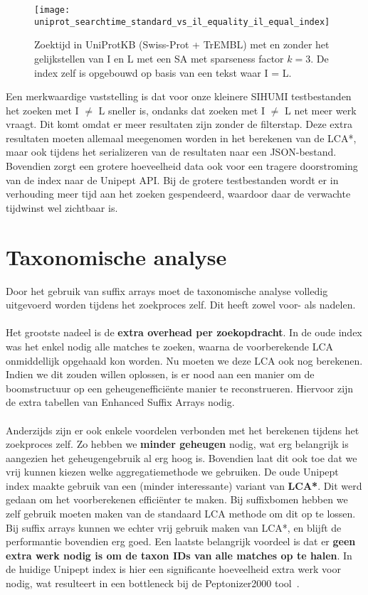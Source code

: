 \begin{figure}[ht]
    \centering
    \texttt{[image: uniprot\_searchtime\_standard\_vs\_il\_equality\_il\_equal\_index]}
    \caption{Zoektijd in UniProtKB (Swiss-Prot + TrEMBL) met en zonder het gelijkstellen van I en L met een SA met sparseness factor $k = 3$. De index zelf is opgebouwd op basis van een tekst waar I = L.}
    \label{fig:uniprot_search_il_equal}
\end{figure}

Een merkwaardige vaststelling is dat voor onze kleinere SIHUMI testbestanden het zoeken met I $\neq$ L sneller is, ondanks dat zoeken met I $\neq$ L net meer werk vraagt.
Dit komt omdat er meer resultaten zijn zonder de filterstap.
Deze extra resultaten moeten allemaal meegenomen worden in het berekenen van de LCA*, maar ook tijdens het serializeren van de resultaten naar een JSON-bestand.
Bovendien zorgt een grotere hoeveelheid data ook voor een tragere doorstroming van de index naar de Unipept API\@.
Bij de grotere testbestanden wordt er in verhouding meer tijd aan het zoeken gespendeerd, waardoor daar de verwachte tijdwinst wel zichtbaar is.

\section{Taxonomische analyse}\label{sec:taxonomische-analyse}
Door het gebruik van suffix arrays moet de taxonomische analyse volledig uitgevoerd worden tijdens het zoekproces zelf.
Dit heeft zowel voor- als nadelen.
\\ \\
Het grootste nadeel is de \textbf{extra overhead per zoekopdracht}.
In de oude index was het enkel nodig alle matches te zoeken, waarna de voorberekende LCA onmiddellijk opgehaald kon worden.
Nu moeten we deze LCA ook nog berekenen.
Indien we dit zouden willen oplossen, is er nood aan een manier om de boomstructuur op een geheugenefficiënte manier te reconstrueren.
Hiervoor zijn de extra tabellen van Enhanced Suffix Arrays nodig.
\\ \\
Anderzijds zijn er ook enkele voordelen verbonden met het berekenen tijdens het zoekproces zelf.
Zo hebben we \textbf{minder geheugen} nodig, wat erg belangrijk is aangezien het geheugengebruik al erg hoog is.
Bovendien laat dit ook toe dat we vrij kunnen kiezen welke aggregatiemethode we gebruiken.
De oude Unipept index maakte gebruik van een (minder interessante) variant van \textbf{LCA*}.
Dit werd gedaan om het voorberekenen efficiënter te maken.
Bij suffixbomen hebben we zelf gebruik moeten maken van de standaard LCA methode om dit op te lossen.
Bij suffix arrays kunnen we echter vrij gebruik maken van LCA*, en blijft de performantie bovendien erg goed.
Een laatste belangrijk voordeel is dat er \textbf{geen extra werk nodig is om de taxon IDs van alle matches op te halen}.
In de huidige Unipept index is hier een significante hoeveelheid extra werk voor nodig, wat resulteert in een bottleneck bij de Peptonizer2000 tool~\cite{pep_gm}.


